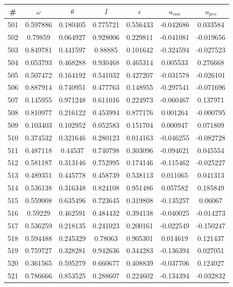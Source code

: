 \newpage
\begin{table}
\begin{tabular}{c|c|c|c|c|c|c}
\# & $\omega$ & $\theta$ & $I$ & $\epsilon$ & $u_{con}$ & $u_{pro}$\\
\hline
501 & 0.597886 & 0.180405 & 0.775721 & 0.556433 & -0.042686 & 0.033584\\
502 & 0.79859 & 0.064927 & 0.928006 & 0.229811 & -0.041081 & -0.019656\\
503 & 0.849781 & 0.441597 & 0.88885 & 0.101642 & -0.324594 & -0.027523\\
504 & 0.053793 & 0.468288 & 0.930468 & 0.465314 & 0.005533 & 0.276668\\
505 & 0.507472 & 0.164192 & 0.541032 & 0.427207 & -0.031578 & -0.026101\\
506 & 0.887914 & 0.740951 & 0.477763 & 0.148955 & -0.297541 & -0.071696\\
507 & 0.145955 & 0.971248 & 0.611016 & 0.224973 & -0.060467 & 0.137971\\
508 & 0.810977 & 0.216122 & 0.453994 & 0.877176 & 0.001264 & -0.000795\\
509 & 0.103403 & 0.102952 & 0.052583 & 0.151704 & 0.000947 & 0.071809\\
510 & 0.374532 & 0.321646 & 0.280123 & 0.014163 & -0.046255 & -0.082728\\
511 & 0.487118 & 0.44537 & 0.740798 & 0.303096 & -0.094621 & 0.045554\\
512 & 0.581187 & 0.313146 & 0.752995 & 0.174146 & -0.115462 & -0.025227\\
513 & 0.489351 & 0.445778 & 0.458739 & 0.538113 & 0.011065 & 0.041313\\
514 & 0.536138 & 0.316348 & 0.824108 & 0.951486 & 0.057582 & 0.185849\\
515 & 0.559008 & 0.635496 & 0.723645 & 0.319808 & -0.135257 & 0.06067\\
516 & 0.59229 & 0.462591 & 0.484432 & 0.394138 & -0.040025 & -0.014273\\
517 & 0.536259 & 0.218135 & 0.241023 & 0.200161 & -0.022549 & -0.150247\\
518 & 0.594488 & 0.245329 & 0.78063 & 0.905301 & 0.014619 & 0.121437\\
519 & 0.759727 & 0.328281 & 0.942636 & 0.344283 & -0.136394 & 0.027051\\
520 & 0.361565 & 0.595279 & 0.660677 & 0.408839 & -0.037706 & 0.124027\\
521 & 0.786666 & 0.853525 & 0.288607 & 0.224602 & -0.134394 & -0.032832\\

\end{tabular}
\end{table}
